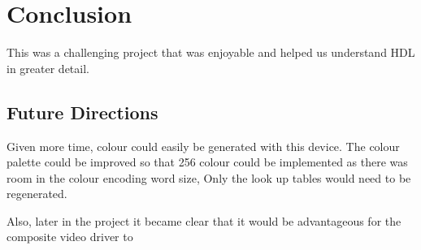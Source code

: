 \section{Conclusion}

This was a challenging project that was enjoyable and helped us understand
HDL in greater detail. 

\subsection{Future Directions}

Given more time, colour could easily be generated with this device. The colour
palette could be improved so that 256 colour could be implemented as there was
room in the colour encoding word size, Only the look up tables would need to be
regenerated. 

Also, later in the project it became clear that it would be advantageous for the
composite video driver to 
